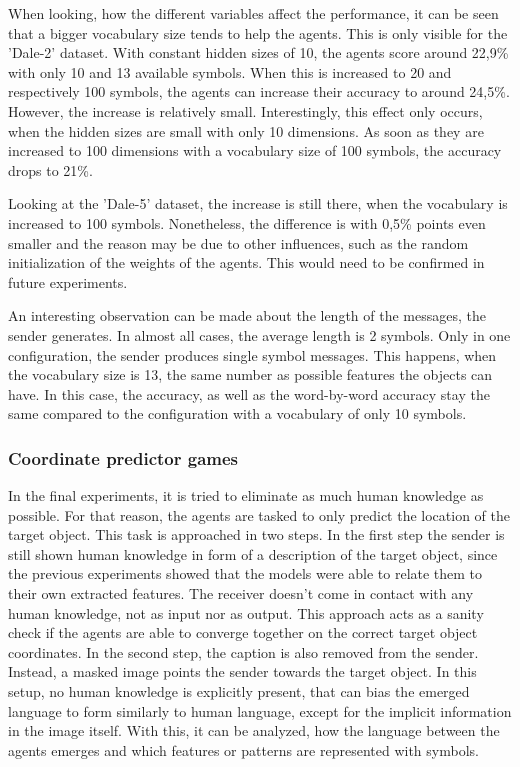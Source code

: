 When looking, how the different variables affect the performance, it can be seen that a bigger vocabulary size tends to help the agents.
This is only visible for the 'Dale-2' dataset.
With constant hidden sizes of 10, the agents score around 22,9\% with only 10 and 13 available symbols.
When this is increased to 20 and respectively 100 symbols, the agents can increase their accuracy to around 24,5\%.
However, the increase is relatively small.
Interestingly, this effect only occurs, when the hidden sizes are small with only 10 dimensions.
As soon as they are increased to 100 dimensions with a vocabulary size of 100 symbols, the accuracy drops to 21\%.

Looking at the 'Dale-5' dataset, the increase is still there, when the vocabulary is increased to 100 symbols.
Nonetheless, the difference is with 0,5\% points even smaller and the reason may be due to other influences, such as the random initialization of the weights of the agents.
This would need to be confirmed in future experiments.

An interesting observation can be made about the length of the messages, the sender generates.
In almost all cases, the average length is 2 symbols.
Only in one configuration, the sender produces single symbol messages.
This happens, when the vocabulary size is 13, the same number as possible features the objects can have.
In this case, the accuracy, as well as the word-by-word accuracy stay the same compared to the configuration with a vocabulary of only 10 symbols.


\subsubsection{Coordinate predictor games}
In the final experiments, it is tried to eliminate as much human knowledge as possible.
For that reason, the agents are tasked to only predict the location of the target object.
This task is approached in two steps.
In the first step the sender is still shown human knowledge in form of a description of the target object, since the previous experiments showed that the models were able to relate them to their own extracted features.
The receiver doesn't come in contact with any human knowledge, not as input nor as output.
This approach acts as a sanity check if the agents are able to converge together on the correct target object coordinates.
In the second step, the caption is also removed from the sender.
Instead, a masked image points the sender towards the target object.
In this setup, no human knowledge is explicitly present, that can bias the emerged language to form similarly to human language, except for the implicit information in the image itself.
With this, it can be analyzed, how the language between the agents emerges and which features or patterns are represented with symbols.

